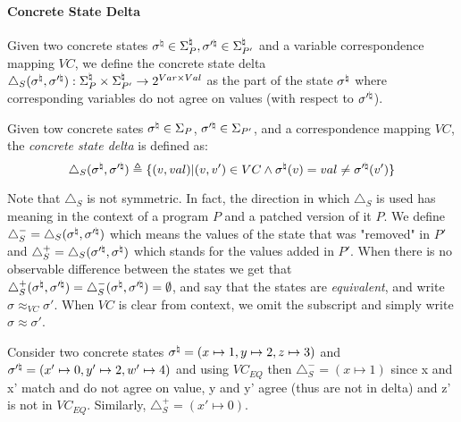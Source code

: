 \paragraph{Concrete State Delta} 
Given two concrete states $\sigma^\natural \in \Sigma_{P}^\natural,\sigma'^\natural \in \Sigma_{P'}^\natural$ and a variable correspondence mapping $VC$, we define the concrete state delta $\triangle_{S}(\sigma^\natural,\sigma'^\natural) : \Sigma^\natural_{P} \times \Sigma^\natural_{P'} \rightarrow 2^{Var \times Val}$ as the part of the state $\sigma^\natural$ where corresponding variables do not agree on values (with respect to $\sigma'^\natural$).

\begin{definition}
Given tow concrete sates $\sigma^\natural \in \Sigma_{P}$, $\sigma'^\natural \in \Sigma_{P'}$, and a correspondence mapping $VC$, the \emph{concrete state delta} is defined as:
\[
\triangle_{S}(\sigma^\natural,\sigma'^\natural) \triangleq \{ (v,val) | (v,v') \in VC \wedge \sigma^\natural(v) = val \neq \sigma'^\natural(v')\}
\]
\end{definition}
Note that $\triangle_{S}$ is not symmetric. In fact, the direction in which $\triangle_{S}$ is used has meaning in the context of a program $P$ and a patched version of it $P$. We define $\triangle_{S}^{-} = \triangle_{S}(\sigma^\natural,\sigma'^\natural)$ which means the values of the state that was "removed" in $P'$ and $\triangle_{S}^{+} = \triangle_{S}(\sigma'^\natural,\sigma^\natural)$ which stands for the values added in $P'$. When there is no observable difference between the states we get that $\triangle_{S}^{+}(\sigma^\natural,\sigma'^\natural)= \triangle_{S}^{-}(\sigma^\natural,\sigma'^\natural) = \emptyset$, and say that the states are \emph{equivalent}, and write $\sigma \approx_{VC} \sigma'$. When $VC$ is clear from context, we omit the subscript and simply write $\sigma \approx \sigma'$.

\begin{Example}
Consider two concrete states $\sigma^\natural = (x \mapsto 1,y \mapsto 2,z \mapsto 3)$ and $\sigma'^\natural = (x' \mapsto 0,y' \mapsto 2,w' \mapsto 4)$ and using $VC_{EQ}$ then $\triangle_{S}^{-} = (x \mapsto 1)$ since x and x' match and do not agree on value, y and y' agree (thus are not in delta) and z' is not in $VC_{EQ}$. Similarly, $\triangle_{S}^{+} = (x' \mapsto 0)$. %
\end{Example}

